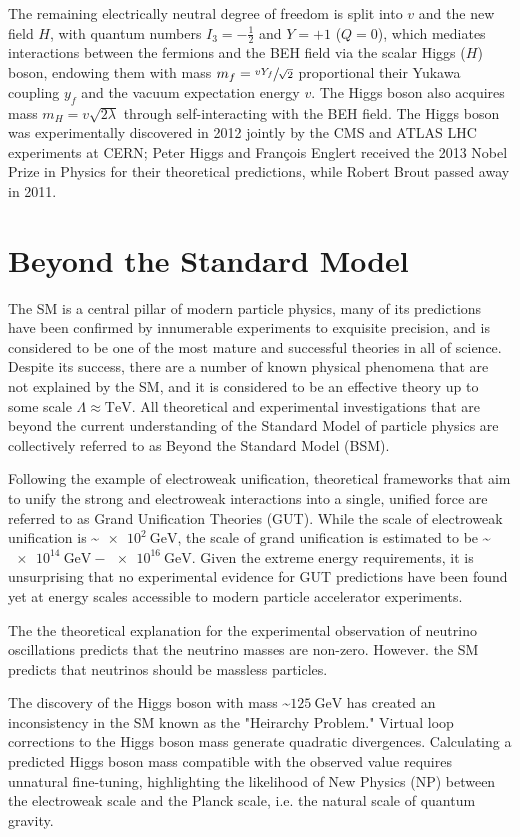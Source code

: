 The remaining electrically neutral degree of freedom is split into $v$ and the new field $H$, with quantum numbers $I_3 = -\frac{1}{2}$ and $Y = +1$ ($Q = 0$), which mediates interactions between the fermions and the BEH field via the scalar Higgs ($H$) boson, endowing them with mass $m_f = \sfrac{v Y_f}{\sqrt{2}}$ proportional their Yukawa coupling $y_f$ and the vacuum expectation energy $v$.
The Higgs boson also acquires mass $m_H = v \sqrt{2 \lambda}$ through self-interacting with the BEH field.
The Higgs boson was experimentally discovered in 2012 jointly by the CMS and ATLAS LHC experiments at CERN; Peter Higgs and François Englert received the 2013 Nobel Prize in Physics for their theoretical predictions, while Robert Brout passed away in 2011.

\section{Beyond the Standard Model}
The SM is a central pillar of modern particle physics, many of its predictions have been confirmed by innumerable experiments to exquisite precision, and is considered to be one of the most mature and successful theories in all of science.
Despite its success, there are a number of known physical phenomena that are not explained by the SM, and it is considered to be an effective theory up to some scale $\Lambda \approx \si{\TeV}$.
All theoretical and experimental investigations that are beyond the current understanding of the Standard Model of particle physics are collectively referred to as Beyond the Standard Model (BSM).

Following the example of electroweak unification, theoretical frameworks that aim to unify the strong and electroweak interactions into a single, unified force are referred to as Grand Unification Theories (GUT).
While the scale of electroweak unification is \sim$\SI{e2}{\GeV}$, the scale of grand unification is estimated to be \sim$\SI{e14}{\GeV} - \SI{e16}{\GeV}$.
Given the extreme energy requirements, it is unsurprising that no experimental evidence for GUT predictions have been found yet at energy scales accessible to modern particle accelerator experiments.

The the theoretical explanation for the experimental observation of neutrino oscillations predicts that the neutrino masses are non-zero.
However. the SM predicts that neutrinos should be massless particles. 

The discovery of the Higgs boson with mass \sim$\SI{125}{\GeV}$ has created an inconsistency in the SM known as the "Heirarchy Problem."
Virtual loop corrections to the Higgs boson mass generate quadratic divergences.
Calculating a predicted Higgs boson mass compatible with the observed value requires unnatural fine-tuning, highlighting the likelihood of New Physics (NP) between the electroweak scale and the Planck scale, i.e. the natural scale of quantum gravity.

